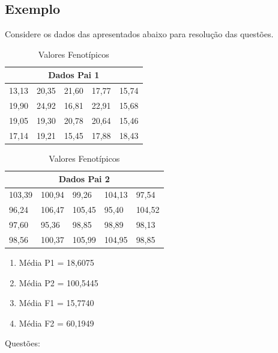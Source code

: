 \subsection{Exemplo}



\begin{example}

Considere os dados das apresentados abaixo para resolução das questões.

\begin{table}[h]
\centering
\begin{tabular}{l l l l l}
\toprule
 \multicolumn{5}{c}{Dados Pai 1}\\
\midrule
13,13 &  20,35 & 21,60 & 17,77 & 15,74 \\
19,90 &  24,92 & 16,81 & 22,91 & 15,68 \\
19,05 &  19,30 & 20,78 & 20,64 & 15,46 \\
17,14 &  19,21 & 15,45 & 17,88 & 18,43 \\
\end{tabular}
\caption{Valores Fenotípicos} \label{tab:t06}
\end{table}


\begin{table}[h]
\centering
\begin{tabular}{l l l l l}
\toprule
 \multicolumn{5}{c}{Dados Pai 2}\\
\midrule
103,39 &  100,94 &  99,26  &  104,13 &  97,54  \\
96,24  &  106,47 &  105,45 &  95,40  &  104,52 \\
97,60  &  95,36  &  98,85  &  98,89  &  98,13  \\
98,56  &  100,37 &  105,99 &  104,95 &  98,85  \\
\end{tabular}
\caption{Valores Fenotípicos} \label{tab:t07}
\end{table}



\begin{enumerate}
\item Média P1 = 18,6075
\item Média P2 = 100,5445
\item Média F1 = 15,7740
\item Média F2 = 60,1949
\end{enumerate}

\end{example}

Questões:

